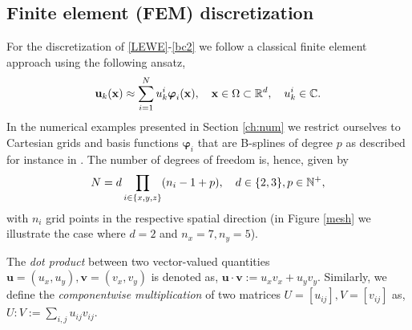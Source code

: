 \subsection{Finite element (FEM) discretization}
\label{ch:discretization}
For the discretization of \eqref{LEWE}-\eqref{bc2} we follow a classical finite element approach using the following ansatz,
\begin{align}
\label{eq:ansatz}
\mathbf{u}_k(\mathbf{x}) \approx \sum_{i=1}^N u_k^i\boldsymbol\varphi_i(\mathbf{x}), \quad \mathbf{x} \in \Omega \subset \mathbb{R}^{d}, \quad u_k^i \in {\mathbb{C}}.
\end{align}
In the numerical examples presented in Section \ref{ch:num} we restrict ourselves to Cartesian grids and basis functions $\boldsymbol\varphi_i$ that are B-splines of degree $p$ as described for instance in \cite[Chapter 2]{isoa09}. The number of degrees of freedom is, hence, given by 
\begin{align}
\label{eq:unknows}
N = d \prod_{i \in \{x,y,z\}} (n_i-1+p), \quad d \in \{2,3\}, p \in \mathbb{N}^{+},
\end{align}
with $n_i$ grid points in the respective spatial direction (in Figure \ref{mesh} we illustrate the case where $d=2$ and $n_x=7, n_y=5$).

\begin{definition}
\label{def:inner}
 The \textit{dot product} between two vector-valued quantities $\mathbf{u} = (u_x,u_y), \mathbf{v} = (v_x,v_y)$ is denoted as,
  $\mathbf{u} \cdot \mathbf{v} := u_x v_x + u_y v_y$. Similarly, we define the \textit{componentwise multiplication} of two matrices $U = [u_{ij}], V = [v_{ij}]$ as,
  $U : V := \sum_{i,j} u_{ij}v_{ij}$.
 \end{definition}

